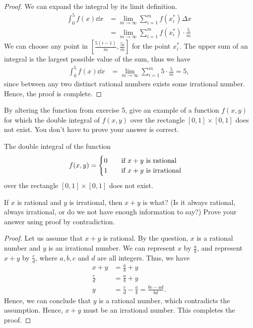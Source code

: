 \documentclass[10pt,twocolumn]{article}
\begin{document}
\begin{proof}
  We can expand the integral by its limit definition.
  \begin{align*}
    \int_0^5f(x)\dd{x} &= \lim_{m\to \infty} \sum_{i=1}^m f(x_{i}^*) \Delta x \\
    &= \lim_{m\to \infty} \sum_{i=1}^m f(x_{i}^*) \cdot \frac{5}{m}
  \end{align*}
  We can choose any point in $[\frac{5(i-1)}{m},\frac{5i}{m}]$ for the point
  $x_i^*$. The upper sum of an integral is the largest possible value of the
  sum, thus we have
  \begin{align*}
    \int_0^5f(x)\dd{x} &= \lim_{m\to \infty} \sum_{i=1}^m 5 \cdot \frac{5}{m} =
    5,
  \end{align*}
  since between any two distinct rational numbers exists some irrational
  number. Hence, the proof is complete.
\end{proof}

\begin{exercise}{6}
  By altering the function from exercise 5, give an example of a function
  $f(x,y)$ for which the double integral of $f(x,y)$ over the rectangle
  $[0,1]\times[0,1]$ does not exist. You don't have to prove your answer is
  correct.
\end{exercise}

\begin{answer}{6}
  The double integral of the function
  \[
    f(x,y) = \begin{cases}
      0& \qq{if $x+y$ is rational}\\
      1& \qq{if $x+y$ is irrational}
    \end{cases}
  \]
  over the rectangle $[0,1]\times[0,1]$ does not exist.
\end{answer}

\begin{exercise}{7}
  If $x$ is rational and $y$ is irrational, then $x + y$ is what? (Is it always
  rational, always irrational, or do we not have enough information to say?)
  Prove your answer using proof by contradiction.
\end{exercise}

\begin{proof}
  Let us assume that $x+y$ is rational. By the question, $x$ is a rational
  number and $y$ is an irrational number. We can represent $x$ by
  $\frac{a}{b}$, and represent $x+y$ by $\frac{c}{d}$, where $a,b,c$ and $d$
  are all integers. Thus, we have
  \begin{align*}
    x + y &= \frac{a}{b} + y \\
    \frac{c}{d} &= \frac{a}{b} + y \\
    y &= \frac{c}{d} - \frac{a}{b} = \frac{bc-ad}{bd}.
  \end{align*}
  Hence, we can conclude that $y$ is a rational number, which contradicts the
  assumption. Hence, $x+y$ must be an irrational number. This completes the
  proof.
\end{proof}
\end{document}
